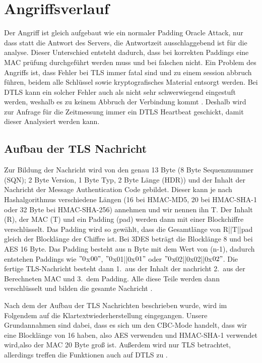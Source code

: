 \documentclass[a4paper,10pt]{scrartcl}
\begin{document}
    \section{Angriffsverlauf}\label{sec:angriffsverlauf}
    Der Angriff ist gleich aufgebaut wie ein normaler Padding Oracle Attack, nur dass statt die Antwort des Servers, die Antwortzeit ausschlaggebend ist für die analyse.
    Dieser Unterschied entsteht dadurch, dass bei korrekten Paddings eine MAC prüfung durchgeführt werden muss und bei falschen nicht.
    Ein Problem des Angriffs ist, dass Fehler bei TLS immer fatal sind und zu einem session abbruch führen, beidem alle Schlüssel sowie kryptografisches Material entsorgt werden.
    Bei DTLS kann ein solcher Fehler auch als nicht sehr schwerwiegend eingestuft werden, weshalb es zu keinem Abbruch der Verbindung kommt \cite[S.5]{AlFardan2013}.
    Deshalb wird zur Anfrage für die Zeitmessung immer ein DTLS Heartbeat geschickt, damit dieser Analysiert werden kann.

    \subsection{Aufbau der TLS Nachricht}\label{subsec:aufbauder-tls-nachricht}
    Zur Bildung der Nachricht wird von den genau 13 Byte (8 Byte Sequenznummer (SQN); 2 Byte Version, 1 Byte Typ, 2 Byte Länge (HDR)) und der Inhalt der Nachricht der Message Authentication Code gebildet.
    Dieser kann je nach Hashalgorithmus verschiedene Längen (16 bei HMAC-MD5, 20 bei HMAC-SHA-1 oder 32 Byte bei HMAC-SHA-256) annehmen und wir nennen ihn T\@.
    Der Inhalt (R), der MAC (T) und ein Padding (pad) werden dann mit einer Blockchiffre verschlüsselt.
    Das Padding wird so gewählt, dass die Gesamtlänge von R||T||pad gleich der Blocklänge der Chiffre ist.
    Bei 3DES beträgt die Blocklänge 8 und bei AES 16 Byte.
    Das Padding besteht aus n Byte mit dem Wert von (n-1), dadurch entstehen Paddings wie \("0\)x\(00"\), \("0\)x01||0x\(01"\) oder \("0\)x02||0x02||0x\(02"\).
    Die fertige TLS-Nachricht besteht dann 1.\ aus der Inhalt der nachricht 2.\ aus der Berechneten MAC und 3.\ dem Padding.
    Alle diese Teile werden dann verschlüsselt und bilden die gesamte Nachricht \cite[S.4]{AlFardan2013}.
    \newpage

    Nach dem der Aufbau der TLS Nachrichten beschrieben wurde, wird im Folgendem auf die Klartextwiederherstellung eingegangen.
    Unsere Grundannahmen sind dabei, dass es sich um den CBC-Mode handelt, dass wir eine Blocklänge von 16 haben, also AES verwenden und HMAC-SHA-1 verwendet wird,also der MAC 20 Byte groß ist.
    Außerdem wird nur TLS betrachtet, allerdings treffen die Funktionen auch auf DTLS zu \cite[s.7]{AlFardan2013}.
\end{document}
